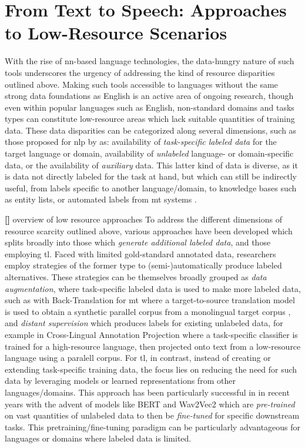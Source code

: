 \documentclass[thesis]{cluu}
\newcounter{paranum}
\newcommand{\numberedparagraph}{\par\refstepcounter{paranum}\textbf{[\theparanum] }}
\begin{document}
\section{From Text to Speech: Approaches to Low-Resource Scenarios}
With the rise of \gls{nn}-based language technologies, the data-hungry nature of such tools underscores the urgency of addressing the kind of resource disparities outlined above. Making such tools accessible to languages without the same strong data foundations as English is an active area of ongoing research, though even within popular languages such as English, non-standard domains and tasks types can constitute low-resource areas which lack suitable quantities of training data. These data disparities can be categorized along several dimensions, such as those proposed for \gls{nlp} by \textcite{hedderichSurveyRecentApproaches2021} as: availability of \textit{task-specific labeled data} for the target language or domain, availability of \textit{unlabeled} language- or domain-specific data, or the availability of \textit{auxiliary} data. This latter kind of data is diverse, as it is data not directly labeled for the task at hand, but which can still be indirectly useful, from labels specific to another language/domain, to knowledge bases such as entity lists, or automated labels from \gls{mt} systems \parencite{hedderichSurveyRecentApproaches2021}.

\numberedparagraph{overview of low resource approaches}
To address the different dimensions of resource scarcity outlined above, various approaches have been developed which \textcite{hedderichSurveyRecentApproaches2021} splits broadly into those which \textit{generate additional labeled data}, and those employing \gls{tl}. Faced with limited gold-standard annotated data, researchers employ strategies of the former type to (semi-)automatically produce labeled alternatives. These strategies can be themselves broadly grouped as \textit{data augmentation}, where task-specific labeled data is used to make more labeled data, such as with Back-Translation for \gls{mt} where a target-to-source translation model is used to obtain a synthetic parallel corpus from a monolingual target corpus \parencite{ranathungaNeuralMachineTranslation2021}, and \textit{distant supervision} which produces labels for existing unlabeled data, for example in Cross-Lingual Annotation Projection where a task-specific classifier is trained for a high-resource language, then projected onto text from a low-resource language using a paralell corpus. For \gls{tl}, in contrast, instead of creating or extending task-specific training data, the focus lies on reducing the need for such data by leveraging models or learned representations from other languages/domains. This approach has been particularly successful in in recent years with the advent of models like BERT \parencite{devlinBERTPretrainingDeep2019} and Wav2Vec2 \parencite{baevskiWav2vec20Framework2020a} which are \textit{pre-trained} on vast quantities of unlabeled data to then be \textit{fine-tuned} for specific downstream tasks. This pretraining/fine-tuning paradigm can be particularly advantageous for languages or domains where labeled data is limited.
\end{document}

